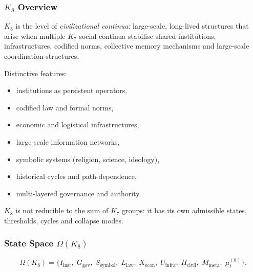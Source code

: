 

\subsubsection{\texorpdfstring{$K_8$}{K_8} Overview}
\label{sec:k8-overview}

$K_8$ is the level of \emph{civilizational continua}: large-scale,
long-lived structures that arise when multiple $K_7$ social continua
stabilise shared institutions, infrastructures, codified norms,
collective memory mechanisms and large-scale coordination structures.

Distinctive features:
\begin{itemize}
    \item institutions as persistent operators,
    \item codified law and formal norms,
    \item economic and logistical infrastructures,
    \item large-scale information networks,
    \item symbolic systems (religion, science, ideology),
    \item historical cycles and path-dependence,
    \item multi-layered governance and authority.
\end{itemize}

$K_8$ is not reducible to the sum of $K_7$ groups: it has its own
admissible states, thresholds, cycles and collapse modes.

\subsubsection{State Space \texorpdfstring{$\Omega(K_8)$}{\Omega(K_8)}}

\[
\Omega(K_8)=
\{
I_{\mathrm{inst}},\;
G_{\mathrm{gov}},\;
S_{\mathrm{symbol}},\;
L_{\mathrm{law}},\;
X_{\mathrm{econ}},\;
U_{\mathrm{infra}},\;
H_{\mathrm{civil}},\;
M_{\mathrm{meta}},\;
\mu^{(8)}_t
\}.
\]

